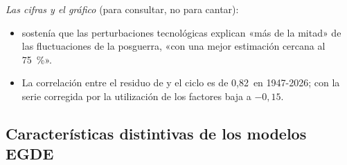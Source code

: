\documentclass[11pt]{article}
\begin{document}
\begin{anotaciones}
\emph{Las cifras y el gráfico} (para consultar, no para cantar):
\begin{itemize}
\item {} sostenía que las perturbaciones tecnológicas explican «más de la mitad» de las fluctuaciones de la posguerra, «con una mejor estimación cercana al 75~\%»\nocite{Prescott1986Response}.
\item La correlación entre el residuo de  y el ciclo es de 0,82~en 1947-2026; con la serie corregida por la utilización de los factores baja a $-0{,}15$\nocite{Fernald2026TFP}.
\end{itemize}
\begin{figuracaja}
\caption{El residuo de  y el ciclo en Estados Unidos, 1947-2026}\label{fig:residuo-solow}
\end{figuracaja}
\end{anotaciones}

\subsection{Características distintivas de los modelos EGDE}\label{sec:caracteristicas-egde}
\end{document}
